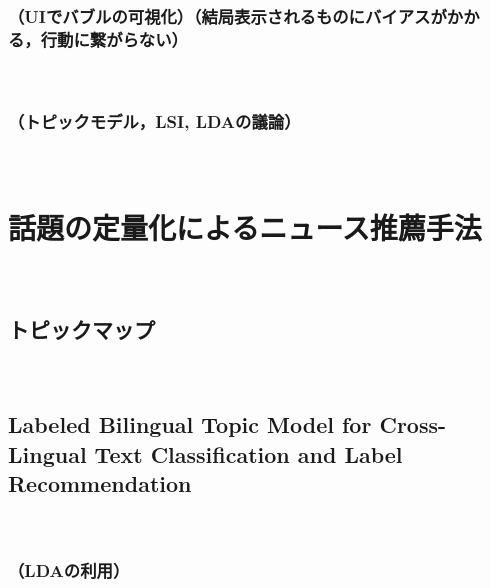 \documentclass[12pt,a4j]{jreport}
\begin{document}
\subsubsection{（UIでバブルの可視化）（結局表示されるものにバイアスがかかる，行動に繋がらない）}
~




\subsubsection{（トピックモデル，LSI, LDAの議論）}
~

\section{話題の定量化によるニュース推薦手法}
~

\subsection{トピックマップ}
~

\subsection{Labeled Bilingual Topic Model for Cross-Lingual Text Classification and Label Recommendation}
~

\subsubsection{（LDAの利用）}
~

~

\end{document}
